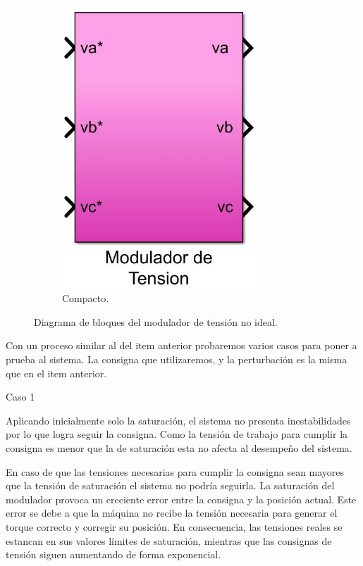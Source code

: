 \documentclass{article}
\begin{document}
\begin{figure}[H]
\begin{subfigure}[b]{0.24\textwidth}
        \includegraphics[width=0.8\textwidth]{modulador_tension_compacto.jpg}
        \caption{Compacto.}
    \end{subfigure}
    \caption{Diagrama de bloques del modulador de tensión no ideal.}
\end{figure}

Con un proceso similar al del item anterior probaremos varios casos para poner a prueba al sistema.
La consigna que utilizaremos, y la perturbación es la misma que en el item anterior.

\bullet Caso 1

Aplicando inicialmente solo la saturación, el sistema no presenta inestabilidades por lo que logra 
seguir la consigna. Como la tensión de trabajo para cumplir la consigna es menor que la de saturación 
esta no afecta al desempeño del sistema. 

En caso de que las tensiones necesarias para cumplir la consigna sean mayores que la tensión de saturación
el sistema no podría seguirla. La saturación del modulador provoca un creciente error entre la consigna y la
posición actual. Este error se debe a que la máquina no recibe la tensión necesaria para generar 
el torque correcto y corregir su posición. En consecuencia, las tensiones reales se estancan en 
sus valores límites de saturación, mientras que las consignas de tensión siguen aumentando de 
forma exponencial.
\end{document}
